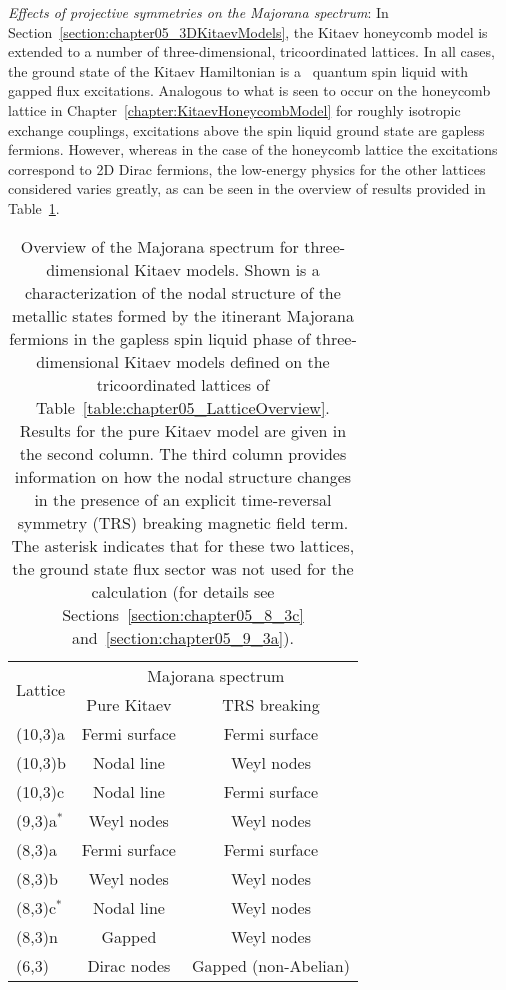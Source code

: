 \textit{Effects of projective symmetries on the Majorana spectrum}:
In Section~\ref{section:chapter05_3DKitaevModels}, the Kitaev honeycomb model is extended to a number of three-dimensional, tricoordinated lattices.
In all cases, the ground state of the Kitaev Hamiltonian is a \ZZ~quantum spin liquid with gapped flux excitations.
Analogous to what is seen to occur on the honeycomb lattice in Chapter~\ref{chapter:KitaevHoneycombModel} for roughly isotropic exchange couplings, excitations above the spin liquid ground state are gapless fermions.
However, whereas in the case of the honeycomb lattice the excitations correspond to 2D Dirac fermions, the low-energy physics for the other lattices considered varies greatly, as can be seen in the overview of results provided in Table~\ref{table:chapter05_MajoranaSpectrumOverview}.
%
\begin{table}[tb]
	\centering
	\begin{tabular*}{\linewidth}{@{\extracolsep{\fill}}l|cc}
		\multirow{2}{*}{Lattice} & \multicolumn{2}{c}{Majorana spectrum} \\
		& Pure Kitaev    & TRS breaking         \\
		\hline\hline
		(10,3)a					 & Fermi surface  & Fermi surface        \\
		(10,3)b 				 & Nodal line     & Weyl nodes           \\
		(10,3)c 				 & Nodal line     & Fermi surface        \\
		\hline
		(9,3)a$^*$ 				 & Weyl nodes     & Weyl nodes           \\
		\hline
		(8,3)a  				 & Fermi surface  & Fermi surface        \\
		(8,3)b  				 & Weyl nodes     & Weyl nodes           \\
		(8,3)c$^*$ 				 & Nodal line     & Weyl nodes           \\
		(8,3)n  				 & Gapped         & Weyl nodes           \\
		\hline
		(6,3)  					 & Dirac nodes    & Gapped (non-Abelian)
	\end{tabular*}
	\caption{
		Overview of the Majorana spectrum for three-dimensional Kitaev models.
		Shown is a characterization of the nodal structure of the metallic states formed by the itinerant Majorana fermions in the gapless spin liquid phase of three-dimensional Kitaev models defined on the tricoordinated lattices of Table~\ref{table:chapter05_LatticeOverview}.
		Results for the pure Kitaev model are given in the second column.
		The third column provides information on how the nodal structure changes in the presence of an explicit time-reversal symmetry (TRS) breaking magnetic field term.
		The asterisk indicates that for these two lattices, the ground state flux sector was not used for the calculation (for details see Sections~\ref{section:chapter05_8_3c} and~\ref{section:chapter05_9_3a}).
	}
	\label{table:chapter05_MajoranaSpectrumOverview}
\end{table}
%

